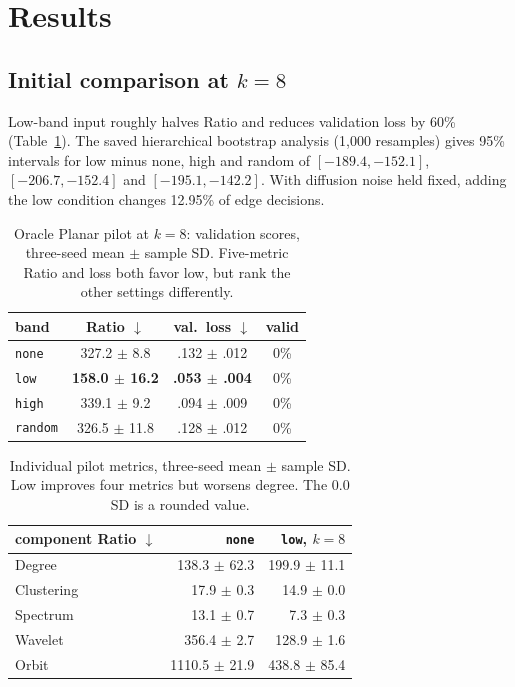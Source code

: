 \documentclass[11pt]{article}
\begin{document}
\section{Results}
\label{sec:results}
\subsection{Initial comparison at \texorpdfstring{$k=8$}{k=8}}
Low-band input roughly halves Ratio and reduces validation loss by 60\%
(Table~\ref{tab:k8}). The saved hierarchical bootstrap analysis (1,000 resamples) gives 95\%
intervals for low minus none, high and random of $[-189.4,-152.1]$, $[-206.7,-152.4]$ and
$[-195.1,-142.2]$. With diffusion noise held fixed, adding the low condition changes 12.95\%
of edge decisions.

\begin{table}[t]
\centering\small
\setlength{\tabcolsep}{4pt}
\begin{tabular}{lccc}
\toprule
band & Ratio $\downarrow$ & val.\ loss $\downarrow$ & valid \\
\midrule
\texttt{none} & 327.2 $\pm$ 8.8 & .132 $\pm$ .012 & 0\% \\
\texttt{low} & \textbf{158.0 $\pm$ 16.2} & \textbf{.053 $\pm$ .004} & 0\% \\
\texttt{high} & 339.1 $\pm$ 9.2 & .094 $\pm$ .009 & 0\% \\
\texttt{random} & 326.5 $\pm$ 11.8 & .128 $\pm$ .012 & 0\% \\
\bottomrule
\end{tabular}
\caption{Oracle Planar pilot at $k{=}8$: validation scores, three-seed mean $\pm$ sample SD.
Five-metric Ratio and loss both favor low, but rank the other settings differently.}
\label{tab:k8}
\end{table}

\begin{table}[t]
\centering\small
\setlength{\tabcolsep}{4pt}
\begin{tabular}{lrr}
\toprule
component Ratio $\downarrow$ & \texttt{none} & \texttt{low}, $k{=}8$ \\
\midrule
Degree & 138.3 $\pm$ 62.3 & 199.9 $\pm$ 11.1 \\
Clustering & 17.9 $\pm$ 0.3 & 14.9 $\pm$ 0.0 \\
Spectrum & 13.1 $\pm$ 0.7 & 7.3 $\pm$ 0.3 \\
Wavelet & 356.4 $\pm$ 2.7 & 128.9 $\pm$ 1.6 \\
Orbit & 1110.5 $\pm$ 21.9 & 438.8 $\pm$ 85.4 \\
\bottomrule
\end{tabular}
\caption{Individual pilot metrics, three-seed mean $\pm$ sample SD. Low improves four metrics
but worsens degree. The 0.0 SD is a rounded value.}
\label{tab:components}
\end{table}
\end{document}
